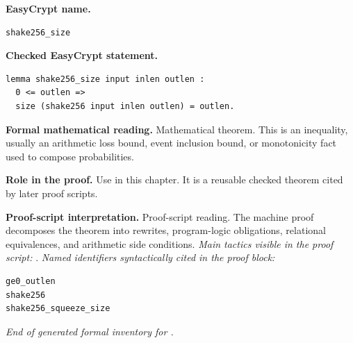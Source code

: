 \begin{formaltheorem}
\noindent\textbf{EasyCrypt name.}
\begin{lstlisting}[language=EasyCrypt,basicstyle=\ttfamily\scriptsize]
shake256_size
\end{lstlisting}
\noindent\textbf{Checked EasyCrypt statement.}
\begin{lstlisting}[language=EasyCrypt,basicstyle=\ttfamily\scriptsize]
lemma shake256_size input inlen outlen :
  0 <= outlen =>
  size (shake256 input inlen outlen) = outlen.
\end{lstlisting}
\noindent\textbf{Formal mathematical reading.}
Mathematical theorem. This is an inequality, usually an arithmetic loss bound, event inclusion bound, or monotonicity fact used to compose probabilities.

\noindent\textbf{Role in the proof.}
Use in this chapter. It is a reusable checked theorem cited by later proof scripts.

\noindent\textbf{Proof-script interpretation.}
Proof-script reading. The machine proof decomposes the theorem into rewrites, program-logic obligations, relational equivalences, and arithmetic side conditions.
\emph{Main tactics visible in the proof script:} .
\emph{Named identifiers syntactically cited in the proof block:}
\begin{lstlisting}[language=EasyCrypt,basicstyle=\ttfamily\scriptsize]
ge0_outlen
shake256
shake256_squeeze_size
\end{lstlisting}

\end{formaltheorem}

\medskip
\noindent\emph{End of generated formal inventory for .}
